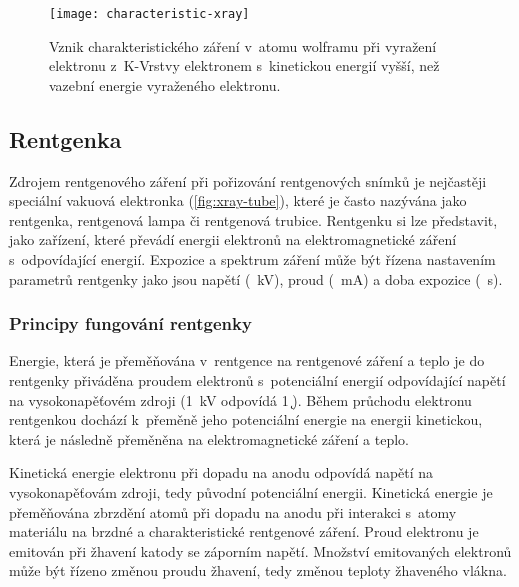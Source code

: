 \begin{figure}[h]
\centering
\texttt{[image: characteristic-xray]}
\caption{Vznik charakteristického záření v~atomu wolframu při vyražení elektronu z~K-Vrstvy elektronem s~kinetickou energií vyšší, než vazební energie vyraženého elektronu. \cite{the-xray-beam}}
\label{fig:characteristic-xray}
\end{figure}

\subsection{Rentgenka}
Zdrojem rentgenového záření při pořizování rentgenových snímků je nejčastěji speciální vakuová elektronka (\cref{fig:xray-tube}), které je často nazývána jako rentgenka, rentgenová lampa či rentgenová trubice. \cite{AstroNuklFyzika-JadRadMetody} Rentgenku si lze představit, jako zařízení, které převádí energii elektronů na elektromagnetické záření s~odpovídající energií. Expozice a spektrum záření může být řízena nastavením parametrů rentgenky jako jsou napětí (\SI{}{\kV}), proud (\SI{}{\mA}) a doba expozice (\SI{}{\s}). \cite[str.~93]{Diagnostic-Radiology-Physics}

\subsubsection{Principy fungování rentgenky}
Energie, která je přeměňována v~rentgence na rentgenové záření a teplo je do rentgenky přiváděna proudem elektronů s~potenciální energií odpovídající napětí na vysokonapěťovém zdroji (\SI{1}{\kV} odpovídá \SI{1}{\k\eV}). 
Během průchodu elektronu rentgenkou dochází k~přeměně jeho potenciální energie na energii kinetickou, která je následně přeměněna na elektromagnetické záření a teplo. 

Kinetická energie elektronu při dopadu na anodu odpovídá napětí na vysokonapěťovám zdroji, tedy původní potenciální energii. Kinetická energie je přeměňována zbrzdění atomů při dopadu na anodu  při interakci s~atomy materiálu na brzdné a charakteristické rentgenové záření. \cite[kap.~ELECTRON ENERGY]{The-Physical-Principles-of-Medical-Imaging}
Proud elektronu je emitován při žhavení katody se záporním napětí. Množství emitovaných elektronů může být řízeno změnou proudu žhavení, tedy změnou teploty žhaveného vlákna. \cite[str.~93]{Diagnostic-Radiology-Physics} 

